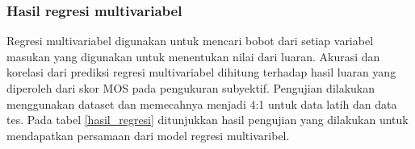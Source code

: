 \subsubsection{Hasil regresi multivariabel}
\hspace{1,2cm}
Regresi multivariabel digunakan untuk mencari bobot dari setiap variabel masukan yang digunakan untuk menentukan nilai dari luaran. Akurasi dan korelasi dari prediksi regresi multivariabel dihitung terhadap hasil luaran yang diperoleh dari skor MOS pada pengukuran subyektif.  Pengujian dilakukan menggunakan dataset dan memecahnya menjadi 4:1 untuk data  latih dan data tes. Pada tabel \ref{hasil_regresi} ditunjukkan hasil pengujian yang dilakukan untuk mendapatkan persamaan dari model regresi multivaribel.


